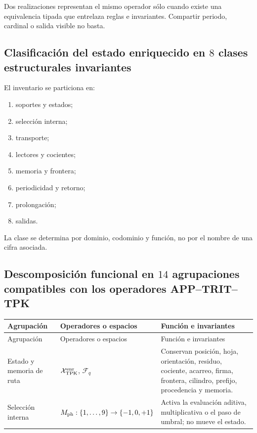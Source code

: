{Dos realizaciones representan el mismo operador sólo cuando existe una
equivalencia tipada que entrelaza reglas e invariantes. Compartir periodo,
cardinal o salida visible no basta.

\subsection{Clasificación del estado enriquecido en \(8\) clases estructurales invariantes}

El inventario se particiona en:
\begin{enumerate}
 \item[\textbf{C1.}] soportes y estados;
 \item[\textbf{C2.}] selección interna;
 \item[\textbf{C3.}] transporte;
 \item[\textbf{C4.}] lectores y cocientes;
 \item[\textbf{C5.}] memoria y frontera;
 \item[\textbf{C6.}] periodicidad y retorno;
 \item[\textbf{C7.}] prolongación;
 \item[\textbf{C8.}] salidas.
\end{enumerate}
La clase se determina por dominio, codominio y función, no por el nombre de
una cifra asociada.

\Needspace{.92\textheight}
\subsection{Descomposición funcional en \(14\) agrupaciones compatibles con los operadores APP–TRIT–TPK}

\begingroup
\small
\renewcommand{\arraystretch}{1.12}
\begin{longtable}{@{}>{\raggedright\arraybackslash}p{}>{\raggedright\arraybackslash}p{}>{\raggedright\arraybackslash}p{}@{}}
\toprule
Agrupación&Operadores o espacios&Función e invariantes\\
\midrule
\endfirsthead
\toprule
Agrupación&Operadores o espacios&Función e invariantes\\
\midrule
\endhead
Estado y memoria de ruta&
\(\mathcal X_{\rm TPK}^{\rm enr}\), \(\mathcal F_q\)&
Conservan posición, hoja, orientación, residuo, cociente, acarreo, firma,
frontera, cilindro, prefijo, procedencia y memoria.\\

Selección interna&
\(M_{\rm ph}:\{1,\ldots,9\}\to\{-1,0,+1\}\)&
Activa la evaluación aditiva, multiplicativa o el paso de umbral; no mueve
el estado.\\


\end{longtable}}

